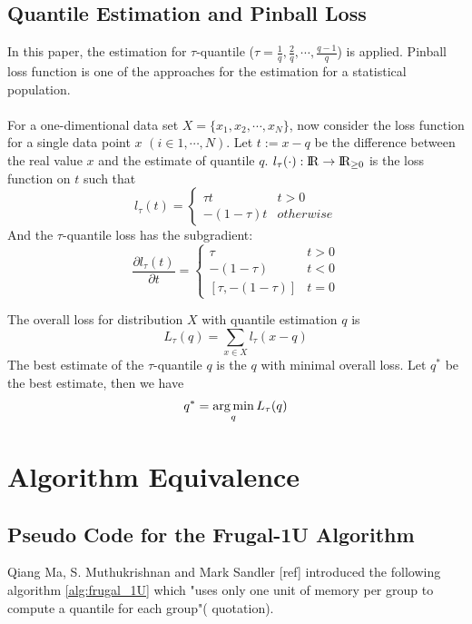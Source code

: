 \documentclass[11pt]{article}
\begin{document}
\subsection{Quantile Estimation and Pinball Loss}
In this paper, the estimation for $\tau$-quantile 
($\tau =  \frac{1}{q}, \frac{2}{q}, \cdots, \frac{q-1}{q}$)
is applied.
Pinball loss function is one of the approaches for the estimation for a statistical population.
\\\\
For a one-dimentional data set $X = \{x_1, x_2, \cdots, x_N\}$, 
now consider the loss function for a single data point $x$ $(i \in {1, \cdots, N})$.
Let $t := x - q$ be the difference between the real value $x$ and the estimate of quantile $q$.
$l_{\tau}(\cdot): \rm I\!R \to \rm I\!R_{\geq 0}$ is the loss function on $t$ such that
$$
l_\tau(t)= 
    \begin{cases}
        \tau t & t > 0\\
        -(1-\tau) t & otherwise
    \end{cases}
$$
And the $\tau$-quantile loss has the {\color{red} subgradient}:
$$
\frac {\partial l_\tau(t)}{\partial t}= 
    \begin{cases}
        \tau                & t > 0\\
        -(1-\tau)           & t < 0\\
        [\tau, -(1 - \tau)] & t = 0
    \end{cases}
$$

The overall loss for distribution $X$ with quantile estimation $q$ is
$$
L_{\tau}(q) = \sum_{x \in X} l_{\tau}(x - q)
$$
The best estimate of the $\tau$-quantile $q$ is the $q$ with minimal overall loss. 
Let $q^\ast$ be the best estimate, then we have
$$
q^\ast = \operatorname*{arg\,min}_{q} L_{\tau}(q)
$$


\section{Algorithm Equivalence}

\subsection{Pseudo Code for the Frugal-1U Algorithm}

Qiang Ma, S. Muthukrishnan and Mark Sandler {\color{red} [ref]}  
introduced the following algorithm \ref{alg:frugal_1U} which 
"uses only one unit of memory per group to compute a quantile for each group"({\color{blue} quotation}).
\end{document}
